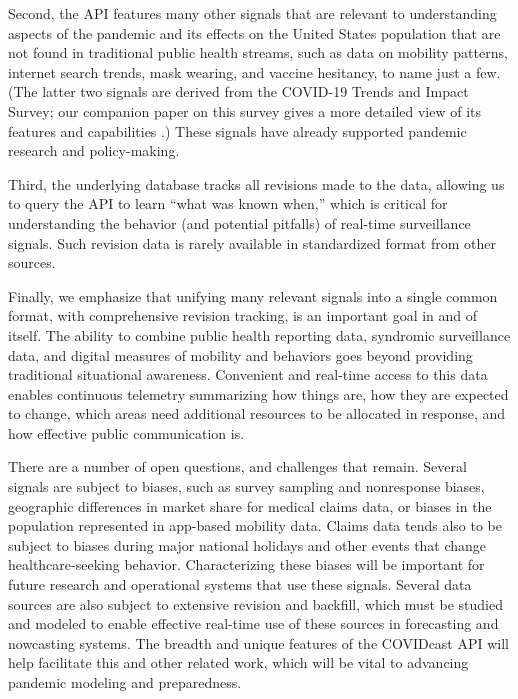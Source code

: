 \documentclass[11pt]{article}
\begin{document}
Second, the API features many other signals that are relevant to understanding
aspects of the pandemic and its effects on the United States population that are
not found in traditional public health streams, such as data on mobility
patterns, internet search trends, mask wearing, and vaccine hesitancy, to name
just a few. (The latter two signals are derived from the COVID-19 Trends and
Impact Survey; our companion paper on this survey gives a more detailed view of
its features and capabilities \cite{Salomon:2021}.) These signals have already
supported pandemic research and policy-making.

Third, the underlying database tracks all revisions made to the data, allowing
us to query the API to learn ``what was known when,'' which is critical for
understanding the behavior (and potential pitfalls) of real-time surveillance
signals. Such revision data is rarely available in standardized format from
other sources.

Finally, we emphasize that unifying many relevant signals into a single common
format, with comprehensive revision tracking, is an important goal in and of
itself. The ability to combine public health reporting data, syndromic
surveillance data, and digital measures of mobility and behaviors goes beyond
providing traditional situational awareness.  Convenient and real-time access to
this data enables continuous telemetry summarizing how things are, how they are
expected to change, which areas need additional resources to be allocated in
response, and how effective public communication is.

There are a number of open questions, and challenges that remain. Several
signals are subject to biases, such as survey sampling and nonresponse biases,
geographic differences in market share for medical claims data, or biases in the
population represented in app-based mobility data.
Claims data tends also to be subject to biases during major national holidays
and other events that change healthcare-seeking behavior. Characterizing these
biases will be important for future research and operational systems that use
these signals.  Several data sources are also subject to extensive revision and
backfill, which must be studied and modeled to enable effective real-time use of
these sources in forecasting and nowcasting systems. The breadth and unique
features of the COVIDcast API will help facilitate this and other related work,
which will be vital to advancing pandemic modeling and preparedness.
\end{document}
